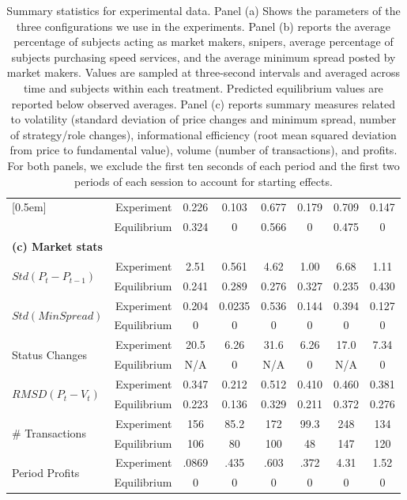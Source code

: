 \documentclass[12pt]{article}
\begin{document}
\begin{table}
{\begin{tabular}{lrcccccc}
                     [0.5em]
\multirow{ 2}{*}{Min. Spread} 
                     &  Experiment & 0.226    & 0.103  & 0.677    & 0.179  & 0.709    & 0.147  \\
                     & Equilibrium & 0.324    & 0 & 0.566    & 0  & 0.475    & 0  \\
\midrule
\multicolumn{8}{l}{{\bf (c) Market stats}} \\
\midrule
\multirow{ 2}{*}{ $Std(P_t-P_{t-1})$  }
						&  Experiment & 2.51 & 0.561 & 4.62 & 1.00  & 6.68 & 1.11 \\
                     & Equilibrium & 0.241    & 0.289 & 0.276    & 0.327  & 0.235    & 0.430  \\
                     [0.5em]
\multirow{ 2}{*}{$Std(MinSpread)$  }
						&  Experiment & 0.204 & 0.0235 & 0.536 & 0.144 & 0.394 & 0.127 \\
                     & Equilibrium & 0    & 0 & 0    & 0  & 0    & 0  \\
                     [0.5em]
\multirow{ 2}{*}{Status Changes  }
						& Experiment & 20.5 & 6.26 & 31.6 & 6.26 & 17.0 & 7.34 \\
                     & Equilibrium & N/A   & 0 & N/A    & 0  & N/A    & 0  \\
                     [0.5em]
\multirow{ 2}{*}{$RMSD(P_t-V_t)$ } 
						&  Experiment  & 0.347 & 0.212 & 0.512 & 0.410 & 0.460 & 0.381 \\
                     & Equilibrium & 0.223    & 0.136 & 0.329    & 0.211  & 0.372    & 0.276  \\
                     [0.5em]
\multirow{ 2}{*}{\# Transactions}                         
  					 & Experiment & 156 & 85.2 & 172 & 99.3 & 248 & 134 \\
  					 & Equilibrium & 106 & 80 & 100 & 48 & 147 & 120 \\
                     [0.5em]
\multirow{ 2}{*}{Period Profits} 
                     & Experiment  & .0869 & .435 & .603 & .372 & 4.31 &  1.52 \\
                     & Equilibrium & 0    & 0 & 0    & 0  & 0    & 0  \\
\bottomrule
\end{tabular}
}
\caption{Summary statistics for experimental data. \small Panel (a) Shows the parameters of the three configurations we use in the experiments. Panel (b) reports the average percentage of subjects acting as market makers, snipers, average percentage of subjects purchasing speed services, and the average minimum spread posted by market makers. Values are sampled at three-second intervals and averaged across time and subjects within each treatment. Predicted equilibrium values are reported below observed averages. Panel (c) reports summary measures related to volatility (standard deviation of price changes and minimum spread, number of strategy/role changes), informational efficiency (root mean squared deviation from price to fundamental value),  volume (number of transactions), and profits. For both panels, we exclude the first ten seconds of each period and the first two periods of each session to account for starting effects. \label{tab:Summary}}
\end{table}
\end{document}
